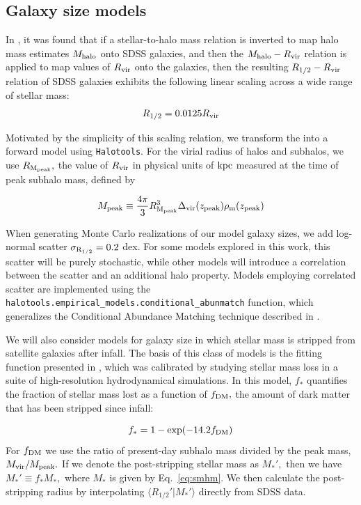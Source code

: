 \documentclass[usenatbib,usegraphicx,letterpaper]{mn2e}
\newcommand{\beq}{\begin{equation}}
\newcommand{\eeq}{\end{equation}}
\newcommand{\rhalf}{R_{1/2}}
\newcommand{\sigmarhalf}{\sigma_{\rm R_{1/2}}}
\newcommand{\mstar}{M_{\ast}}
\newcommand{\mpeak}{M_{\rm peak}}
\newcommand{\zpeak}{z_{\rm peak}}
\newcommand{\mhalo}{M_{\rm halo}}
\newcommand{\rvir}{R_{\rm vir}}
\newcommand{\rmpeak}{R_{\rm M_{peak}}}
\newcommand{\kpc}{{\rm kpc}}
\begin{document}
\subsection{Galaxy size models}
\label{subsec:model}

In \citet{kravtsov13}, it was found that if a stellar-to-halo mass relation is inverted to map halo mass estimates $\mhalo$ onto SDSS galaxies, and then the $\mhalo-\rvir$ relation is applied to map values of $\rvir$ onto the galaxies, then the resulting $\rhalf-\rvir$ relation of SDSS galaxies exhibits the following linear scaling across a wide range of stellar mass:
\beq
\label{eq:fiducial_model}
\rhalf = 0.0125\rvir
\eeq

Motivated by the simplicity of this scaling relation, we transform the \citet{kravtsov13} into a forward model using {\tt Halotools}. For the virial radius of halos and subhalos, we use $\rmpeak,$ the value of $\rvir$ in physical units of $\kpc$ measured at the time of peak subhalo mass, defined by 

\beq
\mpeak\equiv\frac{4\pi}{3}\rmpeak^{3}\Delta_{\rm vir}(\zpeak)\rho_{\rm m}(\zpeak)
\eeq

When generating Monte Carlo realizations of our model galaxy sizes, we add log-normal scatter $\sigmarhalf=0.2$ dex. For some models explored in this work, this scatter will be purely stochastic, while other models will introduce a correlation between the scatter and an additional halo property. Models employing correlated scatter are implemented using the {\tt halotools.empirical\_models.conditional\_abunmatch} function, which generalizes the Conditional Abundance Matching technique described in \citet{hearin_etal13b}. 

We will also consider models for galaxy size in which stellar mass is stripped from satellite galaxies after infall. The basis of this class of models is the fitting function presented in \citet{smith_etal16}, which was calibrated by studying stellar mass loss in a suite of high-resolution hydrodynamical simulations. In this model, $f_{\ast}$ quantifies the fraction of stellar mass lost as a function of $f_{\rm DM},$ the amount of dark matter that has been stripped since infall:

\beq
f_{\ast} = 1 - \exp(-14.2f_{\rm DM})
\eeq
For $f_{\rm DM}$ we use the ratio of present-day subhalo mass divided by the peak mass, $M_{\rm vir}/M_{\rm peak}.$ If we denote the post-stripping stellar mass as $M_{\ast}',$ then we have $M_{\ast}'\equiv f_{\ast}M_{\ast},$ where $M_{\ast}$ is given by Eq.~\ref{eq:smhm}. We then calculate the post-stripping radius by interpolating $\langle\rhalf'\vert\mstar'\rangle$ directly from SDSS data. 
\end{document}
